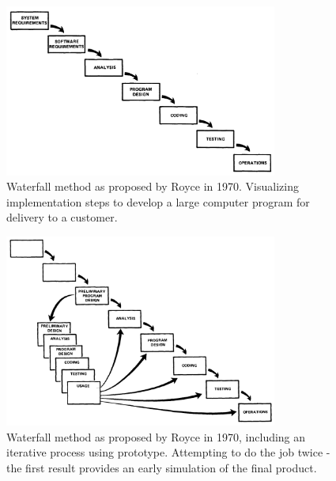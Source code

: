 \begin{figure}
    \centering
    \includegraphics[width=0.8\textwidth]{fig/royce-waterfall.png}
    \caption{Waterfall method as proposed by Royce in 1970. Visualizing implementation steps to develop a large computer program for delivery to a customer.}
    \label{fig:royce}
\end{figure}

\begin{figure}
    \centering
    \includegraphics[width=0.8\textwidth]{fig/royce-waterfall-prototype.png}
    \caption{Waterfall method as proposed by Royce in 1970, including an iterative process using prototype. Attempting to do the job twice - the first result provides an early simulation of the final product.}
    \label{fig:royce-prototype}
\end{figure}

